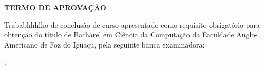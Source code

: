 \begin{folhadeaprovacao}
\begin{center}
	\vspace*{1cm}  
  	\large\textbf{TERMO DE APROVAÇÃO}
  	
  	\vspace*{1cm}
  	{\large\textbf\imprimirautor}

   \vspace*{1cm}
    {\large\textbf\imprimirtitulo}   
 \end{center}     
  
	
	\hspace{.4\textwidth}
	\SingleSpace\noindent\normalsize{Trababhhhlho de conclusão de curso apresentado como requisito obrigatório para obtenção do título de Bacharel em Ciência da Computação da Faculdade Anglo-Americano de Foz do Iguaçu, pela seguinte banca examinadora:}
   
    
   \vspace*{0.5cm}  %
   \vspace*{2.5cm}
   \begin{center}
   	{\imprimirlocal, \ \imprimirdata}
   \end{center}
   
 
\end{folhadeaprovacao}